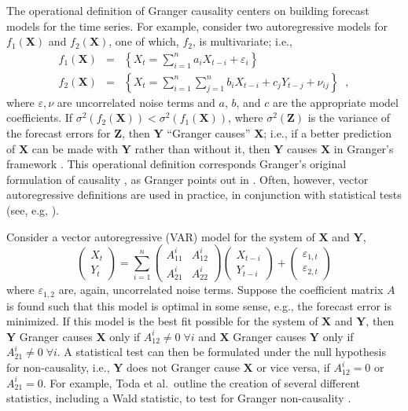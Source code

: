 The operational definition of Granger causality centers on building forecast models for the time series.  For example, consider two autoregressive models for $f_1\left(\mathbf{X}\right)$ and $f_2\left(\mathbf{X}\right)$, one of which, $f_2$, is multivariate; i.e.,
\begin{eqnarray}
f_1\left(\mathbf{X}\right) &=& \left\{X_t = \sum_{i=1}^n a_i X_{t-i} + \varepsilon_i\right\}\\
f_2\left(\mathbf{X}\right) &=& \left\{X_t = \sum_{i=1}^n\sum_{j=1}^n b_i X_{t-i} + c_j Y_{t-j} + \nu_{ij}\right\}\;\;,
\end{eqnarray}
where $\varepsilon,\nu$ are uncorrelated noise terms and $a$, $b$, and $c$ are the appropriate model coefficients.  If $\sigma^2\left(f_2\left(\mathbf{X}\right)\right)<\sigma^2\left(f_1\left(\mathbf{X}\right)\right)$, where $\sigma^2\left(\mathbf{Z}\right)$ is the variance of the forecast errors for $\mathbf{Z}$, then $\mathbf{Y}$ ``Granger causes'' $\mathbf{X}$; i.e., if a better prediction of $\mathbf{X}$ can be made with $\mathbf{Y}$ rather than without it, then $\mathbf{Y}$ causes $\mathbf{X}$ in Granger's framework \cite{Schwert1979}.  This operational definition corresponds Granger's original formulation of causality \cite{Granger1963,Granger1969}, as Granger points out in \cite{Granger1980}.  Often, however, vector autoregressive definitions are used in practice, in conjunction with statistical tests (see, e.g, \cite{Lin2008,Ding2006}).

Consider a vector autoregressive (VAR) model for the system of $\mathbf{X}$ and $\mathbf{Y}$,
\begin{equation}
\label{eqn:VARex1}
\begin{pmatrix}
X_t \\ 
Y_t
\end{pmatrix} = \sum_{i=1}^n \begin{pmatrix}
A_{11}^i & A_{12}^i\\
A_{21}^i & A_{22}^i
\end{pmatrix}\begin{pmatrix}
X_{t-i} \\ 
Y_{t-i}
\end{pmatrix} + \begin{pmatrix}
\varepsilon_{1,t}\\
\varepsilon_{2,t}
\end{pmatrix}
\end{equation}
where $\varepsilon_{1,2}$ are, again, uncorrelated noise terms.  Suppose the coefficient matrix $A$ is found such that this model is optimal in some sense, e.g., the forecast error is minimized.  If this model is the best fit possible for the system of $\mathbf{X}$ and $\mathbf{Y}$, then $\mathbf{Y}$ Granger causes $\mathbf{X}$ only if $A_{12}^i\neq 0\;\forall i$ and $\mathbf{X}$ Granger causes $\mathbf{Y}$ only if $A_{21}^i\neq 0\;\forall i$.  A statistical test can then be formulated under the null hypothesis for non-causality, i.e., $\mathbf{Y}$ does not Granger cause $\mathbf{X}$ or vice versa, if $A_{12}^i = 0$ or $A_{21}^i = 0$.  For example, Toda et al.\ outline the creation of several different statistics, including a Wald statistic, to test for Granger non-causality \cite{Toda1994}.

